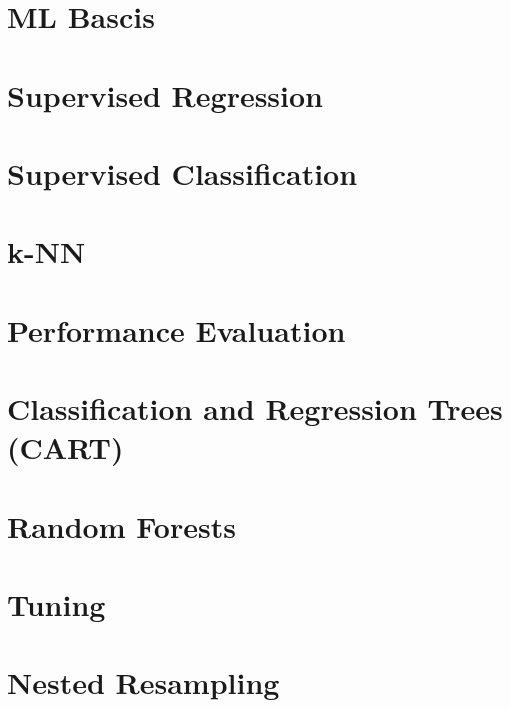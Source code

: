 \documentclass[11pt,compress]{beamer}
\begin{document}


\section{ML Bascis}


\section{Supervised Regression}


\section{Supervised Classification}


\section{k-NN}


\section{Performance Evaluation}


\section{Classification and Regression Trees (CART)}


\section{Random Forests}


\section{Tuning}


\section{Nested Resampling}

\end{document}
